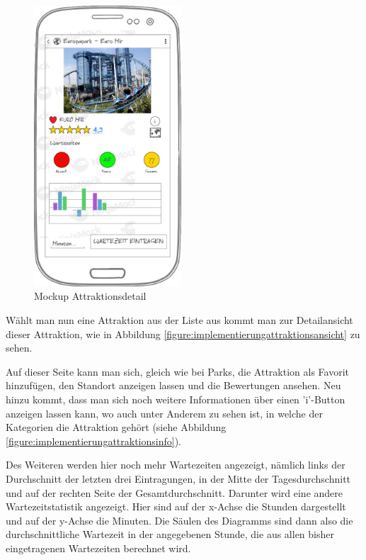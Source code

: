 \begin{figure}[h]
	\centering
	\begin{minipage}{0.49\textwidth}
		\centering
		\includegraphics[width=0.49\textwidth]{img/mockups/m_attraktionsdetail.png}
		\caption{Mockup Attraktionsdetail}
	\end{minipage}
\end{figure}

Wählt man nun eine Attraktion aus der Liste aus kommt man zur Detailansicht dieser Attraktion, wie in Abbildung \ref{figure:implementierungattraktionsansicht} zu sehen. 

Auf dieser Seite kann man sich, gleich wie bei Parks, die Attraktion als Favorit hinzufügen, den 
Standort anzeigen lassen und die Bewertungen ansehen. Neu hinzu kommt, dass man sich noch weitere 
Informationen über einen 'i'-Button anzeigen lassen kann, wo auch unter Anderem zu sehen ist, in 
welche der Kategorien die Attraktion gehört (siehe Abbildung 
\ref{figure:implementierungattraktionsinfo}). 

Des Weiteren werden hier noch mehr Wartezeiten angezeigt, nämlich links der Durchschnitt der letzten drei Eintragungen, in der Mitte der Tagesdurchschnitt und auf der rechten Seite der Gesamtdurchschnitt. 
Darunter wird eine andere Wartezeitstatistik angezeigt. Hier sind auf der x-Achse die Stunden dargestellt und auf der y-Achse die Minuten. Die Säulen des Diagramms sind dann also die durchschnittliche Wartezeit in der angegebenen Stunde, die aus allen bisher eingetragenen Wartezeiten berechnet wird. 

